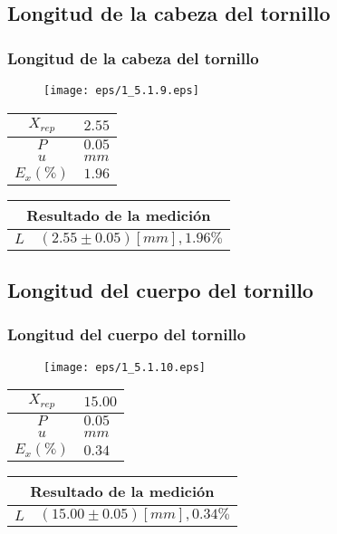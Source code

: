 \documentclass[letter,11pt]{beamer}
\begin{document}
\subsection{Longitud de la cabeza del tornillo}
\begin{frame}
\frametitle{Longitud de la cabeza del tornillo}
\vspace*{0.8cm}
\begin{figure}
\centering
\texttt{[image: eps/1\_5.1.9.eps]}
\end{figure}
\vspace*{0.4cm}
\scriptsize
\begin{tabular}{|c|>{\centering}m{1.8cm}<{\centering}|}
\hline
$X_{rep}$ &   $2.55$ \tabularnewline \hline
      $P$ &   $0.05$ \tabularnewline \hline
      $u$ &     $mm$ \tabularnewline \hline
$E_x(\%)$ &   $1.96$ \tabularnewline \hline
\end{tabular}
\quad
\begin{tabular}{|c|>{\centering}m{5.7cm}<{\centering}|}
\hline
\multicolumn{2}{|c|}{\textbf{Resultado de la medición}} \\ \hline
$L$ & $( 2.55\pm0.05)[mm], 1.96\%$ \tabularnewline \hline
\end{tabular}
\end{frame}

\subsection{Longitud del cuerpo del tornillo}
\begin{frame}
\frametitle{Longitud del cuerpo del tornillo}
\vspace*{0.8cm}
\begin{figure}
\centering
\texttt{[image: eps/1\_5.1.10.eps]}
\end{figure}
\vspace*{0.4cm}
\scriptsize
\begin{tabular}{|c|>{\centering}m{1.8cm}<{\centering}|}
\hline
$X_{rep}$ &  $15.00$ \tabularnewline \hline
      $P$ &   $0.05$ \tabularnewline \hline
      $u$ &     $mm$ \tabularnewline \hline
$E_x(\%)$ &   $0.34$ \tabularnewline \hline
\end{tabular}
\quad
\begin{tabular}{|c|>{\centering}m{5.7cm}<{\centering}|}
\hline
\multicolumn{2}{|c|}{\textbf{Resultado de la medición}} \\ \hline
$L$ & $( 15.00\pm0.05)[mm], 0.34\%$ \tabularnewline \hline
\end{tabular}
\end{frame}
\end{document}
